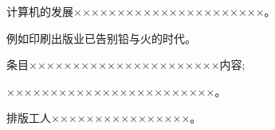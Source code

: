 \documentclass{ctexart}
\begin{document}
\begin{compactenum}[1.]
\item 计算机的发展××××××××××××××××××××××。
\item 例如印刷出版业已告别铅与火的时代。
\begin{compactenum}[(1)]
\item 条目××××××××××××××××××××××内容;
\item ××××××××××××××××××××××××。
\end{compactenum}
\item 排版工人××××××××××××××××。
\end{compactenum}
\end{document}
